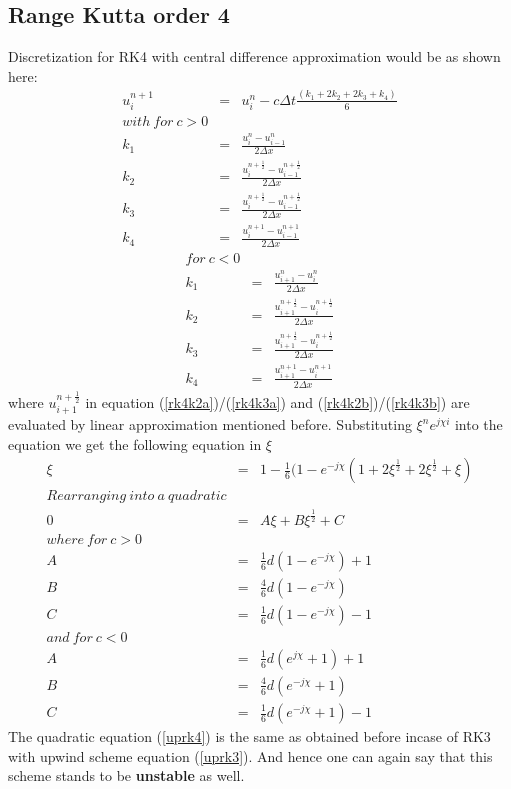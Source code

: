 \documentclass[a4paper,12pt]{report}
\begin{document}
\subsection{Range Kutta order 4}
Discretization for RK4 with central difference approximation would be as shown here:
\begin{eqnarray}
u^{n+1}_{i} &=& u^{n}_{i} - c\Delta t \frac{(k_1+2k_2+2k_3+k_4)}{6}
\\with\ for\ c>0 \nonumber\\
k_1 &=& \frac{u_{i}^{n} -u_{i-1}^{n}}{2\Delta x} \nonumber \\
k_2 &=& \frac{u_{i}^{n+\frac{1}{2}} -u_{i-1}^{n+\frac{1}{2}}}{2\Delta x} \label{rk4k2a}\\
k_3 &=& \frac{u_{i}^{n+\frac{1}{2}} -u_{i-1}^{n+\frac{1}{2}}}{2\Delta x} \label{rk4k3a}\\
k_4 &=& \frac{u_{i}^{n+1} -u_{i-1}^{n+1}}{2\Delta x} \nonumber
\end{eqnarray}
\begin{eqnarray}
for\ c<0 \nonumber \\
k_1 &=& \frac{u_{i+1}^{n} -u_{i}^{n}}{2\Delta x} \nonumber \\
k_2 &=& \frac{u_{i+1}^{n+\frac{1}{2}} -u_{i}^{n+\frac{1}{2}}}{2\Delta x} \label{rk4k2b}\\
k_3 &=& \frac{u_{i+1}^{n+\frac{1}{2}} -u_{i}^{n+\frac{1}{2}}}{2\Delta x} \label{rk4k3b}\\
k_4 &=& \frac{u_{i+1}^{n+1} -u_{i}^{n+1}}{2\Delta x} \nonumber
\end{eqnarray}
where $u_{i+1}^{n+\frac{1}{2}}$ in equation (\ref{rk4k2a})/(\ref{rk4k3a}) and (\ref{rk4k2b})/(\ref{rk4k3b}) are evaluated by linear approximation mentioned before.
Substituting $\xi^{n}e^{j\chi i}$ into the equation we get the following equation in $\xi$
\begin{eqnarray}
\xi &=& 1- \frac{1}{6}(1-e^{-j\chi}(1+2\xi^\frac{1}{2}+2\xi^\frac{1}{2} +\xi)\nonumber \\
Rearranging\ into\ a\ quadratic \nonumber \\
0 &=& A\xi+B\xi^{\frac{1}{2}} + C \label{uprk4}\\
where\ for\ c>0 \nonumber\\
A &=& \frac{1}{6}d(1-e^{-j\chi})+1  \nonumber\\
B &=& \frac{4}{6}d(1-e^{-j\chi}) \nonumber\\
C &=& \frac{1}{6}d(1-e^{-j\chi}) - 1 \nonumber \\
and\ for\ c<0 \nonumber\\
A &=& \frac{1}{6}d(e^{j\chi}+1)+1  \nonumber\\
B &=& \frac{4}{6}d(e^{-j\chi}+1) \nonumber\\
C &=& \frac{1}{6}d(e^{-j\chi}+1) - 1 \nonumber
\end{eqnarray}
The quadratic equation (\ref{uprk4}) is the same as obtained before incase of RK3 with upwind scheme equation (\ref{uprk3}). And hence one can again say that this scheme stands to be \textbf{unstable} as well.
\newpage
\end{document}
